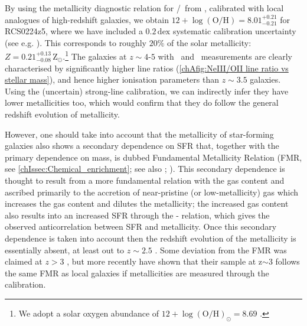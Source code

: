 By using the metallicity diagnostic relation for \NeIII/\OII\ from \citet{2018ApJ...859..175B}, calibrated with local analogues of high-redshift galaxies, we obtain $12 + \log \left ( \text{O/H} \right) = 8.01_{-0.21}^{+0.21}$ for RCS0224z5, where we have included a $0.2 \, \mathrm{dex}$ systematic calibration uncertainty (see e.g. \citealt{2006A&A...459...85N}). This corresponds to roughly $20\%$ of the solar metallicity: $Z = 0.21_{-0.08}^{+0.13} \, \mathrm{Z_\odot}$.\footnote{We adopt a solar oxygen abundance of $12 + \log \left ( \text{O/H} \right)_\odot = 8.69$ \citep{2009ARA&A..47..481A}.} The galaxies at $z \sim 4$-$5$ with \NeIII\ and \OII\ measurements are clearly characterised by significantly higher line ratios (\cref{chAfig:NeIII/OII line ratio vs stellar mass}), and hence higher ionisation parameters than $z \sim 3.5$ galaxies. Using the (uncertain) strong-line calibration, we can indirectly infer they have lower metallicities too, which would confirm that they do follow the general redshift evolution of metallicity.

However, one should take into account that the metallicity of star-forming galaxies also shows a secondary dependence on SFR that, together with the primary dependence on mass, is dubbed Fundamental Metallicity Relation (FMR, see \cref{chIssec:Chemical_enrichment}; see also \citealt{2010MNRAS.408.2115M}; ). This secondary dependence is thought to result from a more fundamental relation with the gas content \citep{2013MNRAS.433.1425B, 2016MNRAS.455.1156B, 2016A&A...595A..48B} and ascribed primarily to the accretion of near-pristine (or low-metallicity) gas which increases the gas content and dilutes the metallicity; the increased gas content also results into an increased SFR through the \citeauthor{1959ApJ...129..243S}-\citeauthor{1989ApJ...344..685K} relation, which gives the observed anticorrelation between SFR and metallicity. Once this secondary dependence is taken into account then the redshift evolution of the metallicity is essentially absent, at least out to $z \sim 2.5$ \citep{2010MNRAS.408.2115M, 2019A&A...627A..42C}. Some deviation from the FMR was claimed at $z > 3$ \citep{2014A&A...563A..58T}, but more recently \cite{2021ApJ...914...19S} have shown that their sample at z$\sim$3 follows the same FMR as local galaxies if metallicities are measured through the \citet{2018ApJ...859..175B} calibration.

